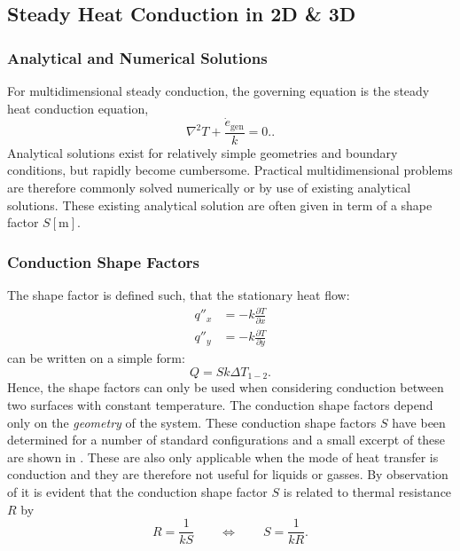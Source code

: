 

\subsection{Steady Heat Conduction in 2D \& 3D}

\subsubsection{Analytical and Numerical Solutions}
For multidimensional steady conduction, the governing equation is the steady heat conduction equation,
\begin{equation*}
   \nabla^2 T + \frac{\dot e_\mathrm{gen}}{k}=0.
.\end{equation*}
Analytical solutions exist for relatively simple geometries and boundary conditions, but rapidly become cumbersome.
Practical multidimensional problems are therefore commonly solved numerically or by use of existing analytical solutions.
These existing analytical solution are often given in term of a shape factor $S [\unit{\m}]$.

\subsubsection{Conduction Shape Factors}
The shape factor is defined such, that the stationary heat flow:
\begin{align*}
  q''_x &= -k \frac{\partial T}{\partial x} \\
  q''_y &= -k \frac{\partial T}{\partial y} 
\end{align*}
can be written on a simple form:
\begin{equation} \label{eq:condshape}
  Q = S k \Delta T_{1-2}
.\end{equation}
Hence, the shape factors can only be used when considering conduction between two surfaces with constant temperature.
The conduction shape factors depend only on the \textit{geometry} of the system.
These conduction shape factors $S$ have been determined for a number of standard configurations and a small excerpt of these are shown in .
These are also only applicable when the mode of heat transfer is conduction and they are therefore not useful for liquids or gasses.
By observation of  it is evident that the conduction shape factor $S$ is related to thermal resistance $R$ by
\begin{equation*}
  R = \frac{1}{kS} \qquad \iff \qquad S = \frac{1}{kR}
.\end{equation*}


